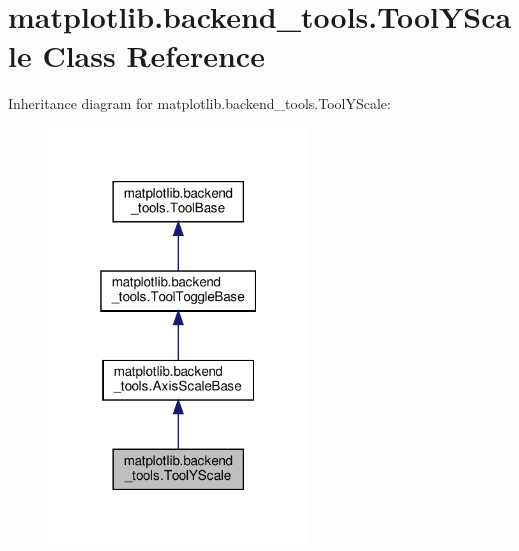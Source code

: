 \hypertarget{classmatplotlib_1_1backend__tools_1_1ToolYScale}{}\section{matplotlib.\+backend\+\_\+tools.\+Tool\+Y\+Scale Class Reference}
\label{classmatplotlib_1_1backend__tools_1_1ToolYScale}


Inheritance diagram for matplotlib.\+backend\+\_\+tools.\+Tool\+Y\+Scale\+:
\nopagebreak
\begin{figure}[H]
\begin{center}
\leavevmode
\includegraphics[width=196pt]{classmatplotlib_1_1backend__tools_1_1ToolYScale__inherit__graph}
\end{center}
\end{figure}


